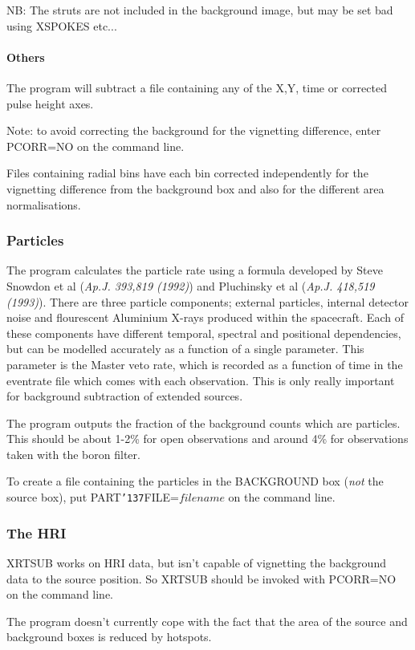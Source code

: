 \documentclass{book}
\renewcommand{\_}{{\tt\char'137}}     %
\begin{document}
NB: The struts are not included in the background image, but may be
set bad using XSPOKES etc...
 
\paragraph{Others}
The program will subtract a file containing any of the X,Y, time
or corrected pulse height axes.
 
Note: to avoid correcting the background for the vignetting difference,
enter PCORR=NO on the command line.
 
Files containing radial bins have each bin corrected independently
for the vignetting difference from the background box and also for
the different area normalisations.
 
\subsubsection{Particles}
The program calculates the particle rate using a formula developed
by Steve Snowdon et al ({\em Ap.J. 393,819 (1992)}) and Pluchinsky et al
({\em Ap.J. 418,519 (1993)}). There are three particle components;
external particles, internal detector noise and flourescent Aluminium
X-rays produced within the spacecraft. Each of these components have
different temporal, spectral and positional dependencies, but can be
modelled accurately as a function of a single parameter. This parameter
is the Master veto rate, which is recorded as a function of time in the
eventrate file which comes with each observation. This is only
really important for background subtraction of extended sources.
 
The program outputs the fraction of the background counts which are
particles. This should be about 1-2\% for open observations and
around 4\% for observations taken with the boron filter.
 
To create a file containing the particles in the BACKGROUND box
({\em not} the source box), put PART\_FILE=$filename$ on
the command line.
 
\subsubsection{The HRI}
XRTSUB works on HRI data, but isn't capable of vignetting the
background data to the source position. So XRTSUB should be
invoked with PCORR=NO on the command line.
 
The program doesn't currently cope with the fact that the area of the
source and background boxes is reduced by hotspots.
 
\end{document}

